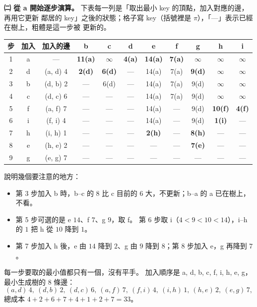 \begin{pastsoln}
\textbf{㈡ 從 a 開始逐步演算。} 下表每一列是「取出最小 key 的頂點，加入對應的邊，再用它更新
鄰居的 key」之後的狀態；格子寫 key（括號裡是 $\pi$），「—」表示已經在樹上，粗體是這一步被
更新的。
\begin{center}
\small
\setlength{\tabcolsep}{3.5pt}
\begin{tabular}{ccccccccccc}
\toprule
步 & 加入 & 加入的邊 & b & c & d & e & f & g & h & i \\
\midrule
1 & a & — & \textbf{11(a)} & $\infty$ & \textbf{4(a)} & \textbf{14(a)} & \textbf{7(a)} & $\infty$ & $\infty$ & $\infty$ \\
2 & d & (a, d) 4 & \textbf{2(d)} & \textbf{6(d)} & — & 14(a) & 7(a) & \textbf{9(d)} & $\infty$ & $\infty$ \\
3 & b & (d, b) 2 & — & 6(d) & — & 14(a) & 7(a) & 9(d) & $\infty$ & $\infty$ \\
4 & c & (d, c) 6 & — & — & — & 14(a) & 7(a) & 9(d) & $\infty$ & $\infty$ \\
5 & f & (a, f) 7 & — & — & — & 14(a) & — & 9(d) & \textbf{10(f)} & \textbf{4(f)} \\
6 & i & (f, i) 4 & — & — & — & 14(a) & — & 9(d) & \textbf{1(i)} & — \\
7 & h & (i, h) 1 & — & — & — & \textbf{2(h)} & — & \textbf{8(h)} & — & — \\
8 & e & (h, e) 2 & — & — & — & — & — & \textbf{7(e)} & — & — \\
9 & g & (e, g) 7 & — & — & — & — & — & — & — & — \\
\bottomrule
\end{tabular}
\end{center}
說明幾個要注意的地方：
\begin{itemize}[nosep]
\item 第 3 步加入 b 時，b--c 的 $8$ 比 c 目前的 $6$ 大，不更新；b--a 的 a 已在樹上，不看。
\item 第 5 步可選的是 e $14$、f $7$、g $9$，取 f。 第 6 步取 i（$4 < 9 < 10 < 14$），i--h 的
$1$ 把 h 從 $10$ 降到 $1$。
\item 第 7 步加入 h 後，e 由 $14$ 降到 $2$、g 由 $9$ 降到 $8$；第 8 步加入 e，g 再降到 $7$。
\end{itemize}
每一步要取的最小值都只有一個，沒有平手。 加入順序是 a, d, b, c, f, i, h, e, g，最小生成樹的
$8$ 條邊：
\[
(a, d)\,4,\ (d, b)\,2,\ (d, c)\,6,\ (a, f)\,7,\ (f, i)\,4,\ (i, h)\,1,\ (h, e)\,2,\ (e, g)\,7,
\]
總成本 $4 + 2 + 6 + 7 + 4 + 1 + 2 + 7 = 33$。
\begin{center}
\begin{tikzpicture}[x=1.2cm, y=1.2cm,
  v/.style={circle, draw, fill=black!8, minimum size=5.5mm, inner sep=0pt, font=\small\bfseries},
  w/.style={fill=white, inner sep=1pt, font=\footnotesize}]

\end{tikzpicture}
\end{center}
\end{pastsoln}
